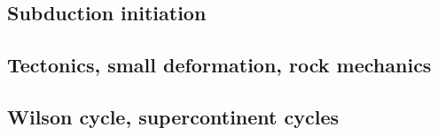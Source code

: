 \cite{wosp92}
\cite{yowo95}
\cite{wowo97}
\cite{desw98}
\cite{wosp00}
\cite{anbi09}
\cite{dugm11}
\cite{dugk12}
\cite{dusg12}
\cite{dugs14}

\subsection*{Subduction initiation}

\cite{togu98}
\cite{dohe01}\cite{reyb01}
\cite{hags03}
\cite{nigm10}
\cite{dyge13}


\subsection*{Tectonics, small deformation, rock mechanics}

\cite{ilma93}
\cite{hept96}
\cite{lega12}

\subsection*{Wilson cycle, supercontinent cycles}

\cite{trry95}
\cite{zhzl07}
\cite{zhzm09}






